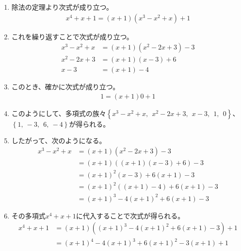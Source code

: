 \documentclass[dvipdfmx]{jsarticle}
\begin{document}
\begin{enumerate}
\item
  除法の定理より次式が成り立つ。
\begin{align*}
x^{4} + x + 1 = (x + 1)\left( x^{3} - x^{2} + x \right) + 1
\end{align*}
\item
  これを繰り返すことで次式が成り立つ。
\begin{align*}
x^{3} - x^{2} + x &= (x + 1)\left( x^{2} - 2x + 3 \right) - 3\\
x^{2} - 2x + 3 &= (x + 1)(x - 3) + 6\\
x - 3 &= (x + 1) - 4
\end{align*}
\item
  このとき、確かに次式が成り立つ。
\begin{align*}
1 = (x + 1)0 + 1
\end{align*}
\item
  このようにして、多項式の族々$\left\{ x^{3} - x^{2} + x,\ \ x^{2} - 2x + 3,\ \ x - 3,\ \ 1,\ \ 0 \right\}$、$\left\{ 1,\  - 3,\ \ 6,\  - 4 \right\}$が得られる。
\item
  したがって、次のようになる。
\begin{align*}
x^{3} - x^{2} + x &= (x + 1)\left( x^{2} - 2x + 3 \right) - 3\\
&= (x + 1)\left( (x + 1)(x - 3) + 6 \right) - 3\\
&= (x + 1)^{2}(x - 3) + 6(x + 1) - 3\\
&= (x + 1)^{2}\left( (x + 1) - 4 \right) + 6(x + 1) - 3\\
&= (x + 1)^{3} - 4(x + 1)^{2} + 6(x + 1) - 3
\end{align*}
\item
  その多項式$x^{4} + x + 1$に代入することで次式が得られる。
\begin{align*}
x^{4} + x + 1 &= (x + 1)\left( (x + 1)^{3} - 4(x + 1)^{2} + 6(x + 1) - 3 \right) + 1\\
&= (x + 1)^{4} - 4(x + 1)^{3} + 6(x + 1)^{2} - 3(x + 1) + 1
\end{align*}
\end{enumerate}
\end{document}
